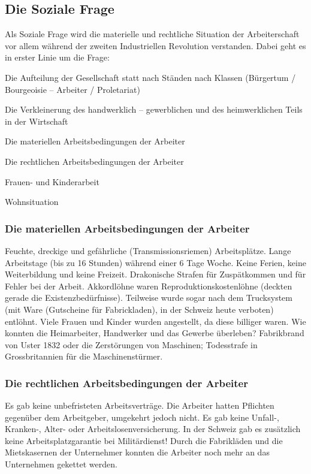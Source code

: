 \documentclass[10pt, openright=true]{scrartcl}
\begin{document}
\subsection{Die Soziale Frage}
Als Soziale Frage wird die materielle und rechtliche Situation der Arbeiterschaft vor allem während der zweiten Industriellen Revolution verstanden. Dabei geht es in erster Linie um die Frage: \vspace{0.25cm}
\begin{citemize}
\item Die Aufteilung der Gesellschaft statt nach Ständen nach Klassen (Bürgertum / Bourgeoisie – Arbeiter / Proletariat)
\item Die Verkleinerung des handwerklich – gewerblichen und des heimwerklichen Teils in der Wirtschaft
\item Die materiellen Arbeitsbedingungen der Arbeiter
\item Die rechtlichen Arbeitsbedingungen der Arbeiter
\item Frauen- und Kinderarbeit
\item Wohnsituation \vspace{0.25cm}
\end{citemize}
\subsubsection{Die materiellen Arbeitsbedingungen der Arbeiter}
Feuchte, dreckige und gefährliche (Transmissionsriemen) Arbeitsplätze. Lange Arbeitstage (bis zu 16 Stunden) während einer 6 Tage Woche. Keine Ferien, keine Weiterbildung und keine Freizeit. Drakonische Strafen für Zuspätkommen und für Fehler bei der Arbeit. Akkordlöhne waren Reproduktionskostenlöhne (deckten gerade die Existenzbedürfnisse). Teilweise wurde sogar nach dem Trucksystem (mit Ware (Gutscheine für Fabrickladen), in der Schweiz heute verboten) entlöhnt. Viele Frauen und Kinder wurden angestellt, da diese billiger waren. Wie konnten die Heimarbeiter, Handwerker und das Gewerbe überleben? Fabrikbrand von Uster 1832 oder die Zerstörungen von Maschinen; Todesstrafe in Grossbritannien für die Maschinenstürmer.
\subsubsection{Die rechtlichen Arbeitsbedingungen der Arbeiter}
Es gab keine unbefristeten Arbeitsverträge. Die Arbeiter hatten Pflichten gegenüber dem Arbeitgeber, umgekehrt jedoch nicht. Es gab keine Unfall-, Kranken-, Alter- oder Arbeitslosenversicherung. In der Schweiz gab es zusätzlich keine Arbeitsplatzgarantie bei Militärdienst! Durch die Fabrikläden und die Mietskasernen der Unternehmer konnten die Arbeiter noch mehr an das Unternehmen gekettet werden.
\end{document}
